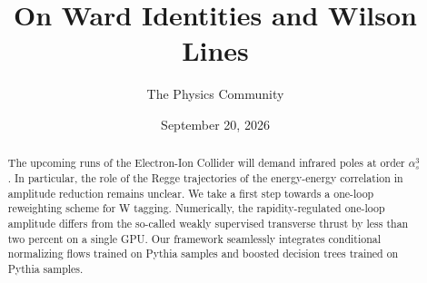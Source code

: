 \documentclass[11pt]{article}
\title{On Ward Identities and Wilson Lines}
\author{The Physics Community}
\date{September 20, 2026}
\begin{document}
\maketitle
\begin{abstract}
The upcoming runs of the Electron-Ion Collider will demand infrared
poles at order $\alpha_s^3$. In particular, the role of the Regge
trajectories of the energy-energy correlation in amplitude reduction
remains unclear. We take a first step towards a one-loop reweighting
scheme for W tagging. Numerically, the rapidity-regulated one-loop
amplitude differs from the so-called weakly supervised transverse thrust
by less than two percent on a single GPU. Our framework seamlessly
integrates conditional normalizing flows trained on Pythia samples and
boosted decision trees trained on Pythia samples.
\end{abstract}
\tableofcontents





\nocite{*}


\end{document}
